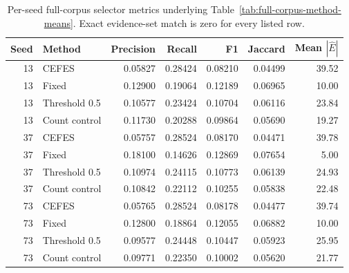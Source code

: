 \begin{table}[!t]
\centering
\caption{Per-seed full-corpus selector metrics underlying Table~\ref{tab:full-corpus-method-means}. Exact evidence-set match is zero for every listed row.}
\label{tab:full-corpus-selector-detail}
\small
\setlength{\tabcolsep}{7pt}
\begin{tabular}{@{}rlrrrrr@{}}
\toprule
Seed & Method & Precision & Recall & F1 & Jaccard & Mean $|\widehat{E}|$ \\
\midrule
13 & CEFES & 0.05827 & 0.28424 & 0.08210 & 0.04499 & 39.52 \\
13 & Fixed & 0.12900 & 0.19064 & 0.12189 & 0.06965 & 10.00 \\
13 & Threshold 0.5 & 0.10577 & 0.23424 & 0.10704 & 0.06116 & 23.84 \\
13 & Count control & 0.11730 & 0.20288 & 0.09864 & 0.05690 & 19.27 \\
37 & CEFES & 0.05757 & 0.28524 & 0.08170 & 0.04471 & 39.78 \\
37 & Fixed & 0.18100 & 0.14626 & 0.12869 & 0.07654 & 5.00 \\
37 & Threshold 0.5 & 0.10974 & 0.24115 & 0.10773 & 0.06139 & 24.93 \\
37 & Count control & 0.10842 & 0.22112 & 0.10255 & 0.05838 & 22.48 \\
73 & CEFES & 0.05765 & 0.28524 & 0.08178 & 0.04477 & 39.74 \\
73 & Fixed & 0.12800 & 0.18864 & 0.12055 & 0.06882 & 10.00 \\
73 & Threshold 0.5 & 0.09577 & 0.24448 & 0.10447 & 0.05923 & 25.95 \\
73 & Count control & 0.09771 & 0.22350 & 0.10002 & 0.05620 & 21.77 \\
\bottomrule
\end{tabular}
\end{table}

